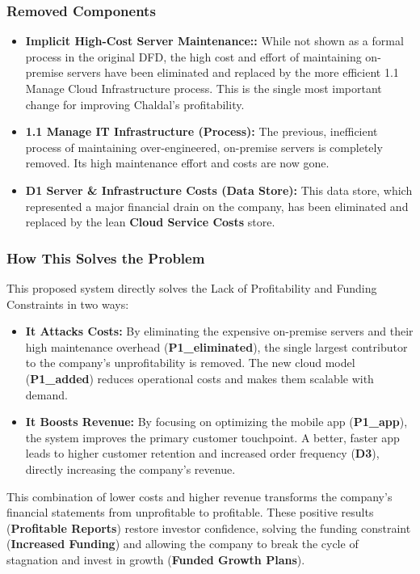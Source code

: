 \documentclass[12pt,a4paper]{article}
\begin{document}
\subsubsection{Removed Components}
\begin{tcolorbox}[colback=red!5!white,colframe=red!75!black,title=Eliminated]
\begin{itemize}
    \item \textbf{Implicit High-Cost Server Maintenance::} While not shown as a formal process in the original DFD, the high cost and effort of maintaining on-premise servers have been eliminated and replaced by the more efficient 1.1 Manage Cloud Infrastructure process. This is the single most important change for improving Chaldal's profitability.
    \item \textbf{1.1 Manage IT Infrastructure (Process):} The previous, inefficient process of maintaining over-engineered, on-premise servers is completely removed. Its high maintenance effort and costs are now gone.
    \item \textbf{D1 Server \& Infrastructure Costs (Data Store):} This data store, which represented a major financial drain on the company, has been eliminated and replaced by the lean \textbf{Cloud Service Costs} store.
\end{itemize}
\end{tcolorbox}

\subsubsection{How This Solves the Problem}
This proposed system directly solves the Lack of Profitability and Funding Constraints in two ways:
\begin{itemize}[leftmargin=*]
  \item \textbf{It Attacks Costs:} By eliminating the expensive on-premise servers and their high maintenance overhead (\textbf{P1\_eliminated}), the single largest contributor to the company's unprofitability is removed. The new cloud model (\textbf{P1\_added}) reduces operational costs and makes them scalable with demand.
  \item \textbf{It Boosts Revenue:} By focusing on optimizing the mobile app (\textbf{P1\_app}), the system improves the primary customer touchpoint. A better, faster app leads to higher customer retention and increased order frequency (\textbf{D3}), directly increasing the company's revenue.
\end{itemize}
This combination of lower costs and higher revenue transforms the company's financial statements from unprofitable to profitable. These positive results (\textbf{Profitable Reports}) restore investor confidence, solving the funding constraint (\textbf{Increased Funding}) and allowing the company to break the cycle of stagnation and invest in growth (\textbf{Funded Growth Plans}).
\end{document}
